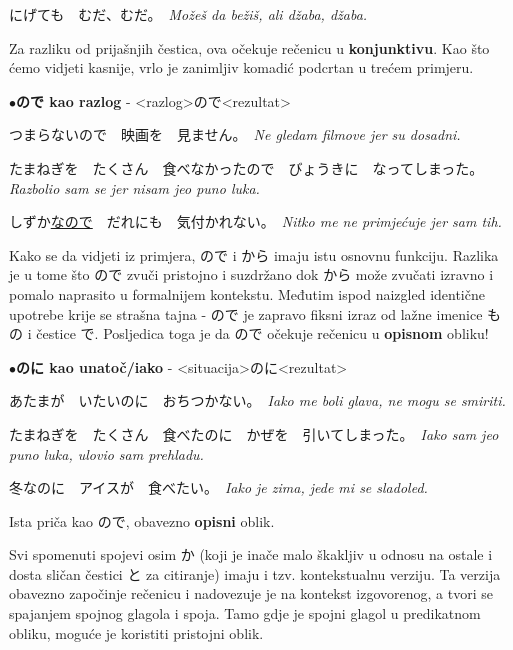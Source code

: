 \documentclass[12pt]{article}
\begin{document}
	にげても　むだ、むだ。　\textit{Možeš da bežiš, ali džaba, džaba.}
	
	\vspace{5pt}
	Za razliku od prijašnjih čestica, ova očekuje rečenicu u \textbf{konjunktivu}. Kao što ćemo vidjeti kasnije, vrlo je zanimljiv komadić podcrtan u trećem primjeru.
	
	\vspace{5pt}
	\noindent
	$\bullet$\textbf{ので kao razlog} - <razlog>ので<rezultat>
	\vspace{5pt}
	
	つまらないので　映画を　見ません。　\textit{Ne gledam filmove jer su dosadni.}
	
	たまねぎを　たくさん　食べなかったので　びょうきに　なってしまった。　\textit{Razbolio sam se jer nisam jeo puno luka.}
	
	しずか\underline{なので}　だれにも　気付かれない。　\textit{Nitko me ne primjećuje jer sam tih.}
	
	\vspace{5pt}
	Kako se da vidjeti iz primjera, ので i から imaju istu osnovnu funkciju. Razlika je u tome što ので zvuči pristojno i suzdržano dok から može zvučati izravno i pomalo naprasito u formalnijem kontekstu. Međutim ispod naizgled identične upotrebe krije se strašna tajna - ので je zapravo fiksni izraz od lažne imenice もの i čestice で. Posljedica toga je da ので očekuje rečenicu u \textbf{opisnom} obliku!
	
	\vspace{5pt}
	\noindent
	$\bullet$\textbf{のに kao unatoč/iako} - <situacija>のに<rezultat>
	\vspace{5pt}
	
	あたまが　いたいのに　おちつかない。　\textit{Iako me boli glava, ne mogu se smiriti.}
	
	たまねぎを　たくさん　食べたのに　かぜを　引いてしまった。　\textit{Iako sam jeo puno luka, ulovio sam prehladu.}
	
	冬なのに　アイスが　食べたい。　\textit{Iako je zima, jede mi se sladoled.}
	
	\vspace{5pt}
	Ista priča kao ので, obavezno \textbf{opisni} oblik.
	
	\vspace{10pt}
	Svi spomenuti spojevi osim か (koji je inače malo škakljiv u odnosu na ostale i dosta sličan čestici と za citiranje) imaju i tzv. kontekstualnu verziju. Ta verzija obavezno započinje rečenicu i nadovezuje je na kontekst izgovorenog, a tvori se spajanjem spojnog glagola i spoja. Tamo gdje je spojni glagol u predikatnom obliku, moguće je koristiti pristojni oblik.
	\vspace{5pt}
	
\end{document}
